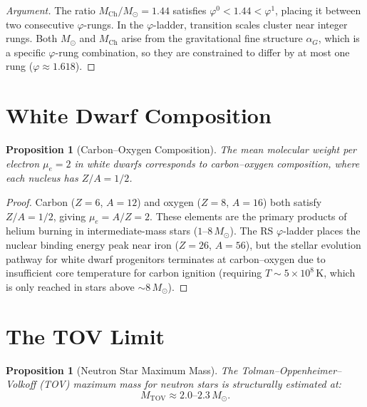 \documentclass[12pt,a4paper]{article}
\newtheorem{proposition}[theorem]{Proposition}
\theoremstyle{definition}
\theoremstyle{remark}
\begin{document}
\begin{proof}[Argument]
The ratio $M_{\mathrm{Ch}}/M_\odot = 1.44$ satisfies
$\varphi^0 < 1.44 < \varphi^1$, placing it between two
consecutive $\varphi$-rungs.  In the $\varphi$-ladder, transition
scales cluster near integer rungs.  Both $M_\odot$ and
$M_{\mathrm{Ch}}$ arise from the gravitational fine structure
$\alpha_G$, which is a specific $\varphi$-rung combination, so
they are constrained to differ by at most one rung ($\varphi
\approx 1.618$).
\end{proof}

\section{White Dwarf Composition}
\label{sec:composition}

\begin{proposition}[Carbon--Oxygen Composition]
\label{prop:CO}
The mean molecular weight per electron $\mu_e = 2$ in white dwarfs
corresponds to carbon--oxygen composition, where each nucleus has
$Z/A = 1/2$.
\end{proposition}

\begin{proof}
Carbon ($Z = 6$, $A = 12$) and oxygen ($Z = 8$, $A = 16$) both
satisfy $Z/A = 1/2$, giving $\mu_e = A/Z = 2$.  These elements
are the primary products of helium burning in intermediate-mass
stars ($1$--$8\,M_\odot$).  The RS $\varphi$-ladder places the
nuclear binding energy peak near iron ($Z = 26$, $A = 56$), but
the stellar evolution pathway for white dwarf progenitors
terminates at carbon--oxygen due to insufficient core temperature
for carbon ignition (requiring $T \sim 5 \times 10^8\,\mathrm{K}$,
which is only reached in stars above $\sim 8\,M_\odot$).
\end{proof}

\section{The TOV Limit}
\label{sec:TOV}

\begin{proposition}[Neutron Star Maximum Mass]
\label{prop:TOV}
The Tolman--Oppenheimer--Volkoff (TOV) maximum mass for
neutron stars is structurally estimated at:
\begin{equation}
  M_{\mathrm{TOV}} \approx 2.0\text{--}2.3\,M_\odot.
\end{equation}
\end{proposition}
\end{document}
